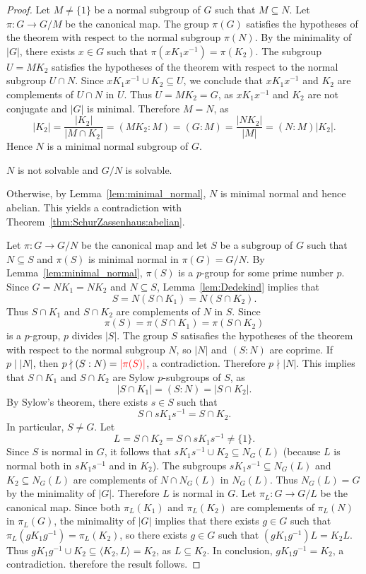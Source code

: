 \begin{proof}
	Let $M\ne\{1\}$ be a normal subgroup of $G$ such that $M\subseteq N$. Let $\pi\colon G\to G/M$
	be the canonical map. The group $\pi(G)$ satisfies the hypotheses of the theorem
	with respect to the normal subgroup $\pi(N)$. By the minimality of $|G|$, there exists 
	$x\in G$ such that $\pi(xK_1x^{-1})=\pi(K_2)$. The subgroup 
	$U=MK_2$ satisfies the hypotheses of the theorem with respect to the normal subgroup 
	$U\cap N$. Since $xK_1x^{-1}\cup K_2\subseteq U$,
	we conclude that $xK_1x^{-1}$ and $K_2$ are complements of $U\cap N$ in $U$.
	Thus $U=MK_2=G$, as $xK_1x^{-1}$ and $K_2$ are not conjugate and $|G|$ is minimal. 
	Therefore $M=N$, as  
	\[
		|K_2|=\frac{|K_2|}{|M\cap K_2|}=(MK_2:M)=(G:M)=\frac{|NK_2|}{|M|}=(N:M)|K_2|.
	\]
    Hence $N$ is a minimal normal subgroup of $G$.
    
	\begin{claim}
		$N$ is not solvable and $G/N$ is solvable. 
	\end{claim}
	
	Otherwise, by Lemma~\ref{lem:minimal_normal}, 	$N$ is minimal normal
	and hence abelian. This yields a contradiction with Theorem~\ref{thm:SchurZassenhaus:abelian}. 
	
	\medskip
	Let $\pi\colon G\to G/N$ be the canonical map and let $S$ be a subgroup of $G$ such that $N\subseteq S$ and $\pi(S)$
	is minimal normal in $\pi(G)=G/N$.  By Lemma~\ref{lem:minimal_normal},
	$\pi(S)$ is a $p$-group for some prime number $p$.  Since $G=NK_1=NK_2$ and $N\subseteq
	S$, Lemma~\ref{lem:Dedekind} implies that  
	\[
	S=N(S\cap K_1)=N(S\cap K_2).
	\]
	Thus $S\cap K_1$ and $S\cap K_2$
	are complements of $N$ in $S$. Since 
	\[
	\pi(S)=\pi(S\cap K_1)=\pi(S\cap K_2)
	\]
	is a $p$-group,
	$p$ divides $|S|$. The group $S$ 
	satisafies the hypotheses of the theorem 
	with respect to the normal subgroup $N$,
	so $|N|$ and $(S:N)$ are coprime. If $p\mid |N|$, then  
	$p\nmid (S:N)=\textcolor{red}{|\pi (S)|}$, a contradiction. Therefore $p\nmid |N|$. 
	This implies that $S\cap K_1$ and $S\cap K_2$ are
	Sylow $p$-subgroups of $S$, as 
	\[
		|S\cap K_1|=(S:N)=|S\cap K_2|.
	\]
	By Sylow's theorem, there exists $s\in
	S$ such that 
	\[
	S\cap sK_1s^{-1}=S\cap K_2.
	\]
	In particular, $S\ne G$.
	Let  
	\[
		L=S\cap K_2=S\cap sK_1s^{-1}\ne\{1\}.
	\]
	Since $S$ is normal in $G$, it follows that $sK_1s^{-1}\cup K_2\subseteq N_G(L)$ (because $L$
	is normal both in $sK_1s^{-1}$ and in $K_2$). The subgroups $sK_1s^{-1}\subseteq
	N_G(L)$ and $K_2\subseteq N_G(L)$ are complements of $N\cap N_G(L)$ in $N_G(L)$. Thus 
	$N_G(L)=G$ by the minimality of $|G|$. Therefore 
	$L$ is normal in $G$. 
	Let $\pi_L\colon G\to G/L$ be the canonical map. Since both 
	$\pi_L(K_1)$ and $\pi_L(K_2)$ are complements of $\pi_L(N)$ in $\pi_L(G)$, the minimality 
	of $|G|$ implies that there exists $g\in G$ such that $\pi_L(gK_1g^{-1})=\pi_L(K_2)$, so  
	there exists $g\in G$ such that $(gK_1g^{-1})L=K_2L$.  Thus $gK_1g^{-1}\cup
	K_2\subseteq \langle K_2,L\rangle=K_2$, as $L\subseteq K_2$. In conclusion,	
	$gK_1g^{-1}=K_2$, a contradiction. therefore the result follows. 
\end{proof}



